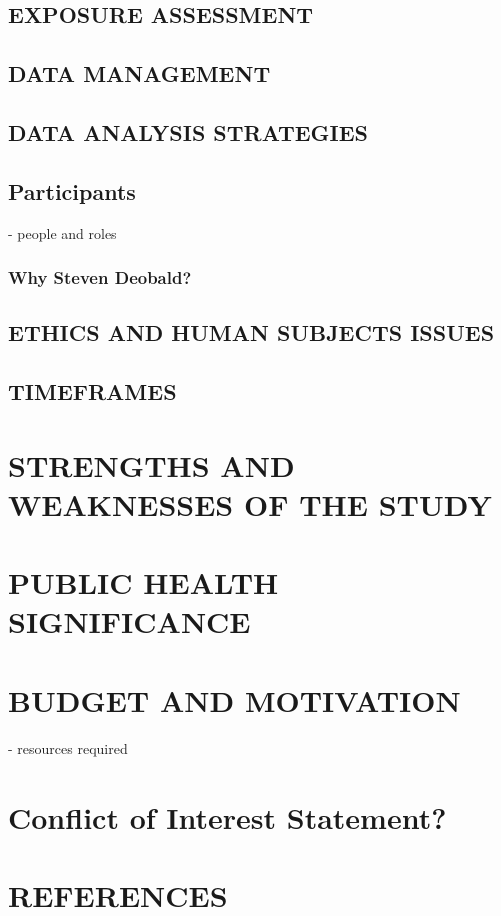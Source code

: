 \documentclass[a4paper, amsfonts, amssymb, amsmath, reprint, showkeys, nofootinbib, twoside]{revtex4-1}
\begin{document}
\subsection{EXPOSURE ASSESSMENT}
\subsection{DATA MANAGEMENT}
\subsection{DATA ANALYSIS STRATEGIES}

\subsection{Participants}
- people and roles

\subsubsection{Why Steven Deobald?}

\subsection{ETHICS AND HUMAN SUBJECTS ISSUES}
\subsection{TIMEFRAMES}

\section{STRENGTHS AND WEAKNESSES OF THE STUDY}
\section{PUBLIC HEALTH SIGNIFICANCE}
\section{BUDGET AND MOTIVATION}
- resources required

\section{Conflict of Interest Statement?}

\section{REFERENCES}
\end{document}
